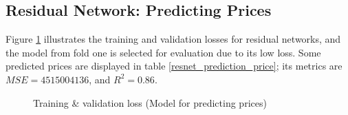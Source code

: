 \documentclass[12pt,twoside]{report}
\begin{document}
\subsection{Residual Network: Predicting Prices}
Figure \ref{all_resnet_full_epoch_1000} illustrates the training and validation losses for residual networks, and the model from fold one is selected for evaluation due to its low loss. Some predicted prices are displayed in table \ref{resnet_prediction_price}; its metrics are $MSE = 4515004136$, and $R^2 = 0.86$. 
\begin{figure}[!htbp]
	\centering
	\hfill
	\hfill
	\hfil
	\hfil
	\caption{Training \& validation loss (Model for predicting prices)}
	\label{all_resnet_full_epoch_1000}
\end{figure}
\end{document}

